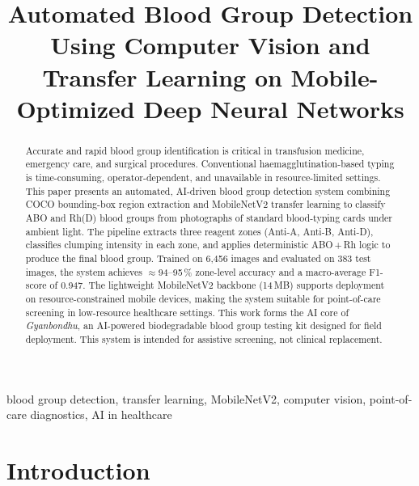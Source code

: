 \documentclass[conference]{IEEEtran}
\begin{document}
\title{Automated Blood Group Detection Using Computer Vision and
       Transfer Learning on Mobile-Optimized Deep Neural Networks}

\author{
}

\maketitle

\begin{abstract}
Accurate and rapid blood group identification is critical in
transfusion medicine, emergency care, and surgical procedures.
Conventional haemagglutination-based typing is time-consuming,
operator-dependent, and unavailable in resource-limited settings.
This paper presents an automated, AI-driven blood group detection
system combining COCO bounding-box region extraction and MobileNetV2
transfer learning to classify ABO and Rh(D) blood groups from
photographs of standard blood-typing cards under ambient light.
The pipeline extracts three reagent zones (Anti-A, Anti-B, Anti-D),
classifies clumping intensity in each zone, and applies deterministic
ABO\,+\,Rh logic to produce the final blood group.
Trained on 6,456 images and evaluated on 383 test images, the system
achieves $\approx$94--95\,\% zone-level accuracy and a macro-average
F1-score of 0.947.
The lightweight MobileNetV2 backbone (14\,MB) supports deployment on
resource-constrained mobile devices, making the system suitable for
point-of-care screening in low-resource healthcare settings.
This work forms the AI core of \emph{Gyanbondhu}, an AI-powered
biodegradable blood group testing kit designed for field deployment.
This system is intended for assistive screening, not clinical
replacement.
\end{abstract}

\begin{IEEEkeywords}
blood group detection, transfer learning, MobileNetV2,
computer vision, point-of-care diagnostics, AI in healthcare
\end{IEEEkeywords}

\section{Introduction}
\end{document}
